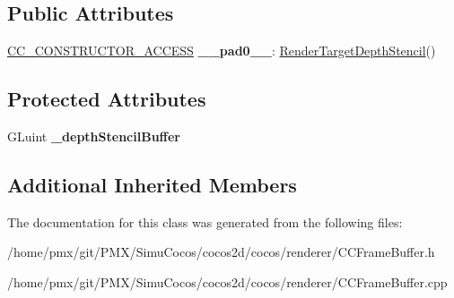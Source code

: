 \subsection*{Public Attributes}
\begin{DoxyCompactItemize}
\item 
\mbox{\label{classexperimental_1_1RenderTargetDepthStencil_aa52d369024823370190c3d8fadb75cf2}} 
\hyperlink{_2cocos2d_2cocos_2base_2ccConfig_8h_a25ef1314f97c35a2ed3d029b0ead6da0}{C\+C\+\_\+\+C\+O\+N\+S\+T\+R\+U\+C\+T\+O\+R\+\_\+\+A\+C\+C\+E\+SS} {\bfseries \+\_\+\+\_\+pad0\+\_\+\+\_\+}\+: \hyperlink{classexperimental_1_1RenderTargetDepthStencil}{Render\+Target\+Depth\+Stencil}()
\end{DoxyCompactItemize}
\subsection*{Protected Attributes}
\begin{DoxyCompactItemize}
\item 
\mbox{\label{classexperimental_1_1RenderTargetDepthStencil_a807fb978e81d5df28b56df8f91d6215d}} 
G\+Luint {\bfseries \+\_\+depth\+Stencil\+Buffer}
\end{DoxyCompactItemize}
\subsection*{Additional Inherited Members}


The documentation for this class was generated from the following files\+:\begin{DoxyCompactItemize}
\item 
/home/pmx/git/\+P\+M\+X/\+Simu\+Cocos/cocos2d/cocos/renderer/C\+C\+Frame\+Buffer.\+h\item 
/home/pmx/git/\+P\+M\+X/\+Simu\+Cocos/cocos2d/cocos/renderer/C\+C\+Frame\+Buffer.\+cpp\end{DoxyCompactItemize}
